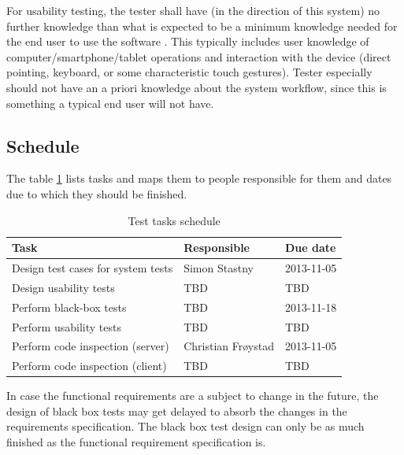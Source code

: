 \documentclass[11pt]{book}
\begin{document}
For usability testing, the tester shall have (in the direction of this system) no further knowledge than what is expected to be a minimum knowledge needed for the end user to use the software . This typically includes user knowledge of computer/smartphone/tablet operations and interaction with the device (direct pointing, keyboard, or some characteristic touch gestures). Tester especially should not have an a priori knowledge about the system workflow, since this is something a typical end user will not have.
\subsection{Schedule}

The table \ref{tab:test_plan_schedule} lists tasks and maps them to people responsible for them and dates due to which they should be finished. 

\begin{table}[H]
    \centering
    \begin{tabular}{| l | l | l |}
        \hline
        Task                                & Responsible             & Due date       \\ \hline
        Design test cases for system tests  & Simon Stastny           & 2013-11-05     \\ \hline
        Design usability tests              & TBD                     & TBD            \\ \hline
        Perform black-box tests             & TBD                     & 2013-11-18     \\ \hline
        Perform usability tests             & TBD                     & TBD            \\ \hline
        Perform code inspection (server)    & Christian Frøystad      & 2013-11-05     \\ \hline
        Perform code inspection (client)    & TBD                     & TBD            \\ \hline
    \end{tabular}
    \label{tab:test_plan_schedule}
    \caption{Test tasks schedule}
\end{table}


In case the functional requirements are a subject to change in the future, the design of black box tests may get delayed to absorb the changes in the requirements specification. The black box test design can only be as much finished as the functional requirement specification is.
\end{document}
